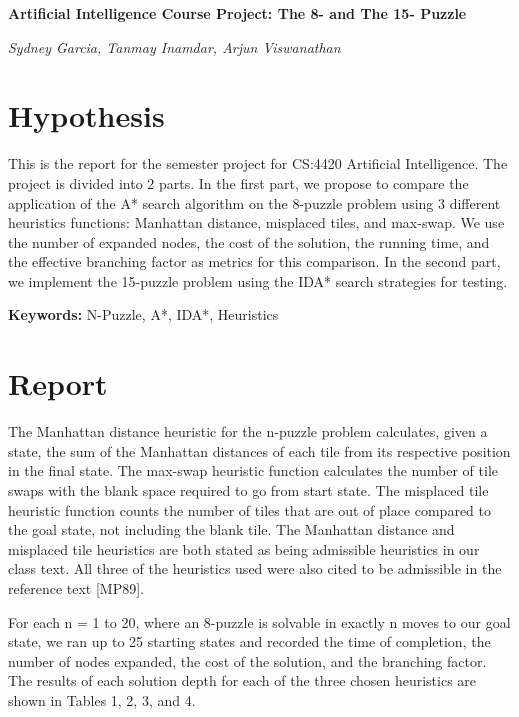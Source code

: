 \documentclass{article}
\begin{document}
	\begin{center}
		\Large \textbf{Artificial Intelligence Course Project: The 8- and The 15- Puzzle}
	\end{center}
	\begin{center}
		\textit{Sydney Garcia, Tanmay Inamdar, Arjun Viswanathan}
	\end{center}

	\section{Hypothesis}
		This is the report for the semester project for CS:4420 Artificial Intelligence. The project is divided into 2 parts. In the first part, we propose to compare the application of the A* search algorithm on the 8-puzzle problem using 3 different heuristics functions: Manhattan distance, misplaced tiles, and max-swap. We use the number of expanded nodes, the cost of the solution, the running time, and the effective branching factor as metrics for this comparison. In the second part, we implement the 15-puzzle problem using the IDA* search strategies for testing. \par 
		
		\textbf{Keywords: } N-Puzzle, A*, IDA*, Heuristics
		
	\section{Report}
		
		The Manhattan distance heuristic for the n-puzzle problem calculates, given a state, the sum of the Manhattan distances of each tile from its respective position in the final state. The max-swap heuristic function calculates the number of tile swaps with the blank space required to go from start state. The misplaced tile heuristic function counts the number of tiles that are out of place compared to the goal state, not including the blank tile. The Manhattan distance and misplaced tile heuristics are both stated as being admissible heuristics in our class text. All three of the heuristics used were also cited to be admissible in the reference text [MP89]. \par
		
		For each n = 1 to 20, where an 8-puzzle is solvable in exactly n moves to our goal state, we ran up to 25 starting states and recorded the time of completion, the number of nodes expanded, the cost of the solution, and the branching factor. The results of each solution depth for each of the three chosen heuristics are shown in Tables 1, 2, 3, and 4. \par
		
\end{document}
